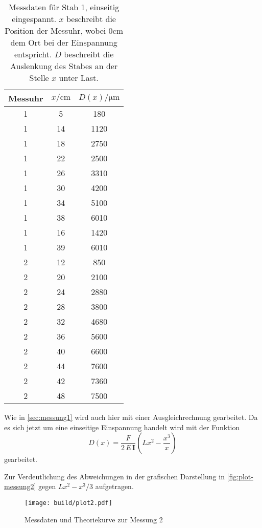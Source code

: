 \begin{table}
	\centering
	\caption{Messdaten für Stab 1, einseitig eingespannt. $x$ beschreibt
	die Position der Messuhr, wobei $0\si{\centi\meter}$
	dem Ort bei der Einspannung entspricht.
	$D$ beschreibt die Auslenkung des Stabes an der Stelle $x$ unter Last.}
	\label{tab:messdaten2}
	\begin{tabular}{c c c}
	\toprule
	Messuhr &
	$x / \si{\centi\meter}$ &
	$D(x) / \si{\micro\meter}$
	\\
	\midrule
	1 & 5 & 180 \\
	1 & 14 & 1120 \\
	1 & 18 & 2750 \\
	1 & 22 & 2500 \\
	1 & 26 & 3310 \\
	1 & 30 & 4200 \\
	1 & 34 & 5100 \\
	1 & 38 & 6010 \\
	1 & 16 & 1420 \\
	1 & 39 & 6010 \\
	2 & 12 & 850 \\
	2 & 20 & 2100 \\
	2 & 24 & 2880 \\
	2 & 28 & 3800 \\
	2 & 32 & 4680 \\
	2 & 36 & 5600 \\
	2 & 40 & 6600 \\
	2 & 44 & 7600 \\
	2 & 42 & 7360 \\
	2 & 48 & 7500 \\
	\bottomrule
\end{tabular}
\end{table}

Wie in \autoref{sec:messung1} wird auch hier mit einer Ausgleichrechnung 
gearbeitet. Da es sich jetzt um eine einseitige Einspannung handelt wird mit der
Funktion
\begin{equation}
	D(x) = \frac{F}{2 \, E \, \mathbf{I}} \left(Lx^2 - \frac{x^3}{x} \right)
\end{equation}
gearbeitet.

Zur Verdeutlichung des Abweichungen in der grafischen Darstellung in
\autoref{fig:plot-messung2} gegen $Lx^2 - x^3/3$ aufgetragen.
\begin{figure}[H]
	\centering
	\texttt{[image: build/plot2.pdf]}
	\caption{Messdaten und Theoriekurve zur Messung 2}
	\label{fig:plot-messung2}
\end{figure}

